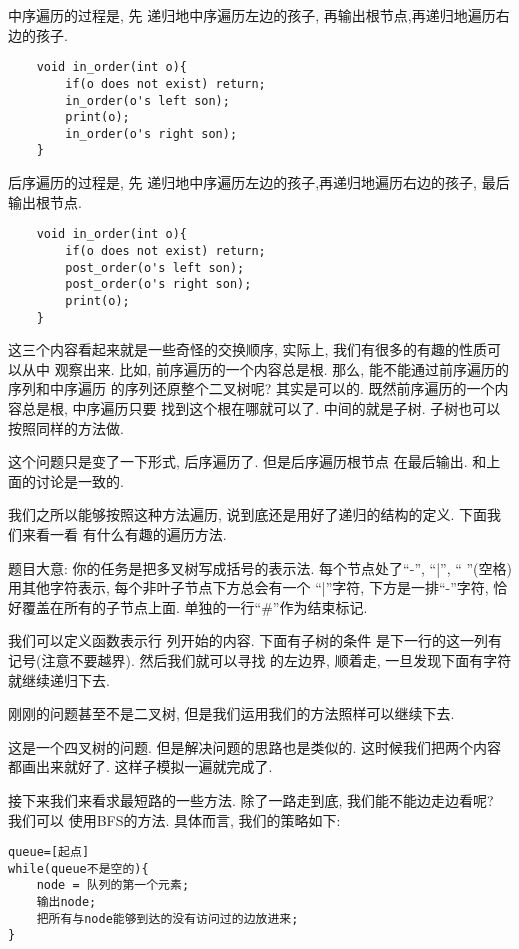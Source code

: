  中序遍历的过程是, 先
递归地中序遍历左边的孩子, 再输出根节点,再递归地遍历右边的孩子. 
\begin{lstlisting}
    void in_order(int o){
        if(o does not exist) return;
        in_order(o's left son);
        print(o);
        in_order(o's right son);
    }
\end{lstlisting}

 后序遍历的过程是, 先
递归地中序遍历左边的孩子,再递归地遍历右边的孩子, 最后输出根节点. 
\begin{lstlisting}
    void in_order(int o){
        if(o does not exist) return;
        post_order(o's left son);
        post_order(o's right son);
        print(o);
    }
\end{lstlisting}

这三个内容看起来就是一些奇怪的交换顺序, 实际上, 我们有很多的有趣的性质可以从中
观察出来. 比如, 前序遍历的一个内容总是根. 那么, 能不能通过前序遍历的序列和中序遍历
的序列还原整个二叉树呢? 其实是可以的. 既然前序遍历的一个内容总是根, 中序遍历只要
找到这个根在哪就可以了. 中间的就是子树. 子树也可以按照同样的方法做. 

 这个问题只是变了一下形式, 后序遍历了. 但是后序遍历根节点
在最后输出. 和上面的讨论是一致的. 

我们之所以能够按照这种方法遍历, 说到底还是用好了递归的结构的定义. 下面我们来看一看
有什么有趣的遍历方法. 

 题目大意: 你的任务是把多叉树写成括号的表示法. 
每个节点处了``-'', ``|'', `` ''(空格)用其他字符表示, 每个非叶子节点下方总会有一个
``|''字符, 下方是一排``-''字符, 恰好覆盖在所有的子节点上面. 单独的一行``\#''作为结束标记.

我们可以定义函数表示行 列开始的内容. 下面有子树的条件
是下一行的这一列有\cw{|}记号(注意不要越界). 然后我们就可以寻找\cw{-} 的左边界, 
顺着\cw{-}走, 一旦发现下面有字符就继续递归下去. 

刚刚的问题甚至不是二叉树, 但是我们运用我们的方法照样可以继续下去. 

 这是一个四叉树的问题. 但是解决问题的思路也是类似的. 
这时候我们把两个内容都画出来就好了. 这样子模拟一遍就完成了. 


接下来我们来看求最短路的一些方法. 除了一路走到底, 我们能不能边走边看呢? 我们可以
使用BFS的方法. 具体而言, 我们的策略如下: 
\begin{lstlisting}
queue=[起点]
while(queue不是空的){
    node = 队列的第一个元素;
    输出node;
    把所有与node能够到达的没有访问过的边放进来;
}
\end{lstlisting}

